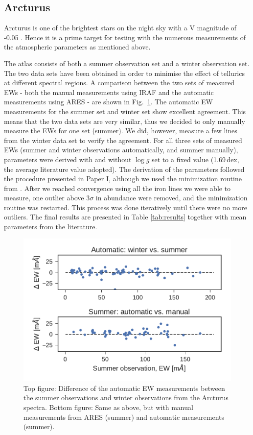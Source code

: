 \documentclass{aa}
\begin{document}
\subsection{Arcturus}
\label{sec:arcturus}

Arcturus is one of the brightest stars on the night sky with a V magnitude of
-0.05 \citep{Ducati2002}. Hence it is a prime target for testing with the
numerous measurements of the atmospheric parameters as mentioned above.

The atlas consists of both a summer observation set and a winter observation
set. The two data sets have been obtained in order to minimise the effect of
tellurics at different spectral regions. A comparison between the two sets of
measured EWs - both the manual measurements using IRAF and the automatic
measurements using ARES - are shown in Fig.~\ref{fig:EWcomp}. The automatic EW
measurements for the summer set and winter set show excellent agreement. This
means that the two data sets are very similar, thus we decided to only manually
measure the EWs for one set (summer). We did, however, measure a few lines from
the winter data set to verify the agreement. For all three sets of measured EWs
(summer and winter observations automatically, and summer manually), parameters
were derived with and without $\log g$ set to a fixed value (1.69\,dex, the
average literature value adopted). The derivation of the parameters followed the
procedure presented in Paper I, although we used the minimization routine from
\citet{Andreasen2017a}. After we reached convergence using all the iron lines we
were able to measure, one outlier above $3\sigma$ in abundance were removed, and
the minimization routine was restarted. This process was done iteratively until
there were no more outliers. The final results are presented in Table
\ref{tab:results} together with mean parameters from the literature.


\begin{figure}[htpb!]
    \centering
    \includegraphics[width=1.0\linewidth]{figures/EWcomp.pdf}
    \caption{Top figure: Difference of the automatic EW measurements between the
             summer observations and winter observations from the Arcturus
             spectra. Bottom figure: Same as above, but with manual measurements
             from ARES (summer) and automatic measurements (summer).}
    \label{fig:EWcomp}
\end{figure}
\end{document}
